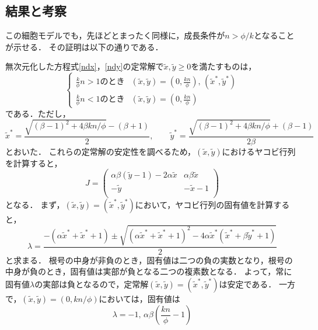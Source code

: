 \subsection{結果と考察}
この細胞モデルでも，先ほどとまったく同様に，成長条件が$n>\phi/k$となることが示せる．
その証明は以下の通りである．

無次元化した方程式\eqref{ndx}，\eqref{ndy}の定常解で$\tilde{x}, \tilde{y} \ge 0$を満たすものは，
\begin{equation}
  \begin{cases}
    \frac{k}{\phi} n > 1 \text{のとき} & (\tilde{x},\tilde{y}) = \left(0, \frac{kn}{\phi}\right),\, \left(\tilde{x}^*, \tilde{y}^*\right) \\
    \frac{k}{\phi} n < 1 \text{のとき} & (\tilde{x},\tilde{y}) = \left(0, \frac{kn}{\phi}\right)
  \end{cases}
\end{equation}
である．ただし，
\begin{equation}
  \tilde{x}^* = \frac{\sqrt{(\beta-1)^2+4\beta kn/\phi} - (\beta+1)}{2}, \qquad \tilde{y}^* = \frac{\sqrt{(\beta-1)^2+4\beta kn/\phi} + (\beta-1)}{2\beta}
\end{equation}
とおいた．
これらの定常解の安定性を調べるため，$(\tilde{x}, \tilde{y})$におけるヤコビ行列を計算すると，
\begin{equation}
  J = \begin{pmatrix}
    \alpha\beta (\tilde{y} -1) -2\alpha \tilde{x} & \alpha\beta \tilde{x} \\
    - \tilde{y} & - \tilde{x} - 1 \\
    \end{pmatrix}
\end{equation}
となる．
まず，$(\tilde{x}, \tilde{y}) = (\tilde{x}^*, \tilde{y}^*)$において，ヤコビ行列の固有値を計算すると，
\begin{equation}
  \lambda = \frac{-(\alpha \tilde{x}^* + \tilde{x}^* + 1) \pm \sqrt{(\alpha \tilde{x}^* + \tilde{x}^* + 1)^2 - 4\alpha \tilde{x}^* (\tilde{x}^* + \beta\tilde{y}^* + 1)}}{2}
\end{equation}
と求まる．
根号の中身が非負のとき，固有値は二つの負の実数となり，根号の中身が負のとき，固有値は実部が負となる二つの複素数となる．
よって，常に固有値$\lambda$の実部は負となるので，定常解$(\tilde{x}, \tilde{y}) = (\tilde{x}^*, \tilde{y}^*)$は安定である．
一方で，$(\tilde{x}, \tilde{y}) = (0, kn/\phi)$においては，固有値は
\begin{equation}
  \lambda = -1,\,\alpha \beta \left(\frac{kn}{\phi} - 1\right)
\end{equation}
